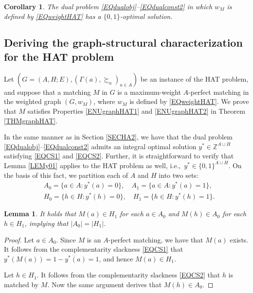 \documentclass[11pt,a4paper,showkeys]{article}
\theoremstyle{plain}
\newtheorem{corollary}[theorem]{Corollary}
\newtheorem{lemma}[theorem]{Lemma}
\theoremstyle{definition}
\newcommand{\ZZ}{{\mathbb{Z}}}
\begin{document}
\begin{corollary}
    \label{CORHAT}
    The dual problem \eqref{EQdualobj}--\eqref{EQdualconst2} in which $w_M$ is defined by \eqref{EQweightHAT} has a $\{0,1\}$-optimal solution. 
\end{corollary}


\subsection{Deriving the graph-structural characterization for the HAT problem}

Let $(G=(A,H;E),(\Gamma(a),\succsim_a)_{a\in A})$ be an instance of the 
HAT problem, 
and suppose that a matching $M$ in $G$ is a maximum-weight $A$-perfect matching in the weighted graph $(G,w_M)$, 
where $w_M$ is defined by \eqref{EQweightHAT}. 
We prove that $M$ satisfies Properties \ref{ENUgraphHAT1} and \ref{ENUgraphHAT2} in Theorem \ref{THMgraphHAT}. 

In the same manner as in Section \ref{SECHA2}, 
we have that 
the dual problem \eqref{EQdualobj}--\eqref{EQdualconst2} admits an 
integral optimal solution $y^*\in \ZZ^{A\cup H}$
satisfying \eqref{EQCS1} and \eqref{EQCS2}. 
Further, 
it is straightforward to verify that 
Lemma \ref{LEMy01} applies to the HAT problem as well, 
i.e.,\ $y^*\in \{0,1\}^{A\cup H}$. 
On the basis of this fact, 
we partition each of $A$ and $H$ into two sets: 
\begin{align*}
    &{}A_0 = \{a\in A \colon y^*(a) =0\}, \quad A_1 = \{a\in A \colon y^*(a) =1\}, \\
    &{}H_0 = \{h\in H \colon y^*(h) =0\}, \quad H_1 = \{h\in H \colon y^*(h) =1\}. 
\end{align*}


\begin{lemma}
    \label{LEMA0H1}
    It holds that 
    $M(a) \in H_1$ for each $a\in A_0$ and 
    $M(h) \in A_0$ for each $h\in H_1$, 
    implying that $|A_0|=|H_1|$. 
\end{lemma}

\begin{proof}
    Let $a\in A_0$. 
    Since $M$ is an $A$-perfect matching, 
    we have that $M(a)$ exists. 
    It follows from the complementarity slackness \eqref{EQCS1} that 
    $ y^*(M(a))=1 - y^*(a) = 1$, 
    and hence $M(a)\in H_1$. 

    Let $h\in H_1$. 
    It follows from 
    the complementarity slackness \eqref{EQCS2} that 
    $h$ is matched by $M$. 
    Now the same argument derives that $M(h)\in A_0$. 
\end{proof}
\end{document}
